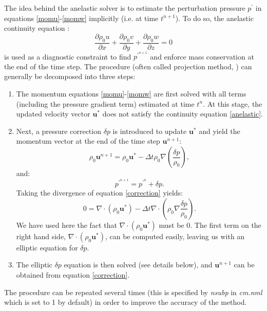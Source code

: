 \documentclass[12pt,A4,french]{article}
\begin{document}
The idea behind the anelastic solver is to estimate the perturbation pressure $p^{\prime}$ in equations \ref{momu}-\ref{momw} implicitly (i.e. at time $t^{n+1}$). To do so, the anelastic continuity equation \cite{Dur2010}:
\begin{equation}
\frac{\partial \rho_0 u}{\partial x} + \frac{\partial \rho_0 v}{\partial y} + \frac{\partial \rho_0 w}{\partial z} = 0
\label{anelastic}
\end{equation}
is used as a diagnostic constraint to find $p^{\prime^{n+1}}$ and enforce mass conservation at the end of the time step. The procedure (often called projection method, \cite{Dur2010}) can generally be decomposed into three steps:
\begin{enumerate}
\item The momentum equations \ref{momu}-\ref{momw} are first solved with all terms (including the pressure gradient term) estimated at time $t^n$. At this stage, the updated velocity vector ${\mathbf u}^{*}$ does not satisfy the continuity equation \ref{anelastic}.
\item Next, a pressure correction $\delta p$ is introduced  to update ${\mathbf u}^{*}$ and yield the momentum vector at the end of the time step ${\mathbf u}^{n+1}$:
\begin{equation}
\rho_0 {\mathbf u}^{n+1} = \rho_0 {\mathbf u}^{*} - \Delta t \rho_0 \nabla\left(\frac{\delta p}{\rho_0}\right),
\label{correction}
\end{equation}
and:
\begin{equation}
    p^{\prime^{n+1}} = p^{\prime^n} + \delta p.
\end{equation}
Taking the divergence of equation \ref{correction} yields:
\begin{equation}
0 = \nabla\cdot\left(\rho_0 {\mathbf u}^{*}\right) - \Delta t \nabla\cdot\left(\rho_0 \nabla\frac{\delta p}{\rho_0}\right).
\label{elliptic}
\end{equation}
We have used here the fact that $\nabla\cdot\left(\rho_0 {\mathbf u}^{*}\right)$ must be 0. The first term on the right hand side,  $\nabla\cdot\left(\rho_0 {\mathbf u}^{*}\right)$, can be computed easily, leaving us with an elliptic equation for $\delta p$. 
\item The elliptic $\delta p$ equation is then solved (see details below), and ${\mathbf u}^{n+1}$ can be obtained from equation \ref{correction}. 
\end{enumerate}
The procedure can be repeated several times (this is specified by {\it nsubp} in {\it cm.nml} which is set to 1 by default) in order to improve the accuracy of the method.  
\end{document}
